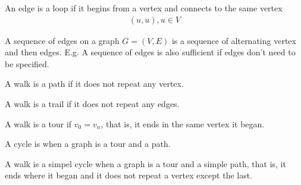 \documentclass[a4paper]{article}
\theoremstyle{plain}
\theoremstyle{definition}
\newtheorem{defn}{Definition}[section]
\theoremstyle{remark}
\begin{document}
\begin{tcolorbox}[colback=black!3!white,colframe=black!60!white,title=\begin{defn}Loop \label{Loop}\end{defn}]
An edge is a loop if it begins from a vertex and connects to the same vertex
\begin{align}
	(u,u), u \in V
\end{align}
\end{tcolorbox}
 \begin{tcolorbox}[colback=black!3!white,colframe=black!60!white,title=\begin{defn}Walk \label{Walk}\end{defn}]
 A sequence of edges on a graph $G=(V,E)$ is a sequence of alternating vertex and then edges. E.g. A sequence of edges is also sufficient if edges don't need to be specified.
 \end{tcolorbox}
 \begin{tcolorbox}[colback=black!3!white,colframe=black!60!white,title=\begin{defn}Path \label{Path}\end{defn}]
 A walk is a path if it does not repeat any vertex.
\end{tcolorbox}
\begin{tcolorbox}[colback=black!3!white,colframe=black!60!white,title=\begin{defn}Trail \label{Trail}\end{defn}]
A walk is a trail if it does not repeat any edges.
\end{tcolorbox}
\begin{tcolorbox}[colback=black!3!white,colframe=black!60!white,title=\begin{defn}Tour \label{Tour}\end{defn}]
A walk is a tour if $v_0=v_n$, that is, it ends in the same vertex it began.
\end{tcolorbox}
\begin{tcolorbox}[colback=black!3!white,colframe=black!60!white,title=\begin{defn}Cycle \label{Cycle}\end{defn}]
A cycle is when a graph is a tour and a path.
\end{tcolorbox}
\begin{tcolorbox}[colback=black!3!white,colframe=black!60!white,title=\begin{defn}Simple Cycle \label{Simple Cycle}\end{defn}]
A walk is a simpel cycle when a graph is a tour and a simple path, that is, it ends where it began and it does not repeat a vertex except the last.
\end{tcolorbox}
\end{document}
